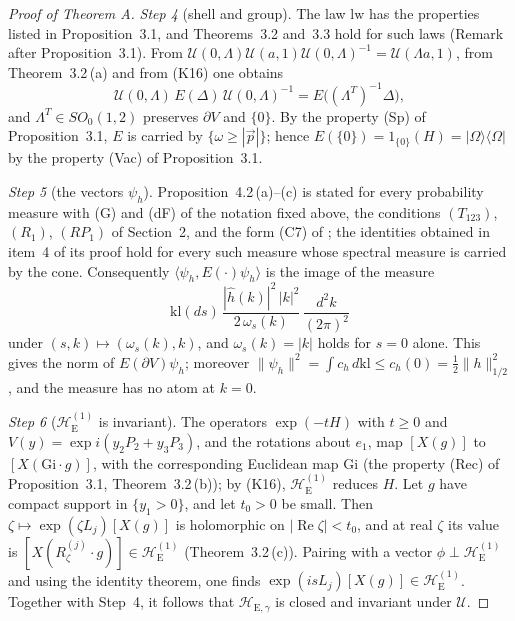 \documentclass[11pt,letterpaper,reqno]{amsart}
\theoremstyle{definition}
\begin{document}
\begin{proof}[Proof of Theorem A]
\emph{Step 4} (shell and group).
The law $\mathrm{lw}$ has the properties listed in Proposition~3.1, and Theorems~3.2 and~3.3 hold for such laws (Remark after Proposition~3.1).
From $\mathcal U(0,\allowbreak \Lambda)\mathcal U(a,\allowbreak 1)\mathcal U(0,\allowbreak \Lambda)^{-1}=\allowbreak \mathcal U(\Lambda a,\allowbreak 1)$, from Theorem~3.2\,(a) and from (K16) one obtains
\begin{equation*}
\mathcal U(0,\Lambda)\,E(\Delta)\,\mathcal U(0,\Lambda)^{-1}=E\bigl((\Lambda^T)^{-1}\Delta\bigr),
\end{equation*}
and $\Lambda^T\in SO_0(1,2)$ preserves $\partial V$ and $\{0\}$.
By the property (Sp) of Proposition~3.1, $E$ is carried by $\{\omega\ge|\vec p|\}$;
hence $E(\{0\})=1_{\{0\}}(H)=|\Omega\rangle\langle\Omega|$ by the property (Vac) of Proposition~3.1.

\emph{Step 5} (the vectors $\psi_h$).
Proposition~4.2\,(a)--(c) is stated for every probability measure with (G) and (dF) of the notation fixed above, the conditions $(T_{123})$, $(R_1)$, $(RP_1)$ of Section~2, and the form (C7) of \cite[Theorem~44]{QEDIII};
the identities obtained in item~4 of its proof hold for every such measure whose spectral measure is carried by the cone.
Consequently $\langle\psi_h,E(\cdot)\psi_h\rangle$ is the image of the measure
\begin{equation*}
\mathrm{kl}(ds)\,\frac{|\hat h(k)|^2\,|k|^2}{2\,\omega_s(k)}\,\frac{d^2k}{(2\pi)^2}
\end{equation*}
under $(s,k)\mapsto(\omega_s(k),k)$, and $\omega_s(k)=|k|$ holds for $s=0$ alone.
This gives the norm of $E(\partial V)\psi_h$;
moreover $\|\psi_h\|^2=\allowbreak \int c_h\,\allowbreak d\mathrm{kl}\le c_h(0)=\allowbreak \frac12\|h\|_{1/2}^2$, and the measure has no atom at $k=0$.

\emph{Step 6} ($\mathcal H_{\mathrm E}^{(1)}$ is invariant).
The operators $\exp(-tH)$ with $t\ge0$ and $V(y)=\exp i(y_2P_2+y_3P_3)$, and the rotations about $e_1$, map $[X(g)]$ to $[X(\mathrm{Gi}\cdot g)]$, with the corresponding Euclidean map $\mathrm{Gi}$ (the property (Rec) of Proposition~3.1, Theorem~3.2\,(b));
by (K16), $\mathcal H_{\mathrm E}^{(1)}$ reduces $H$.
Let $g$ have compact support in $\{y_1>0\}$, and let $t_0>0$ be small.
Then $\zeta\mapsto\exp(\zeta L_j)[X(g)]$ is holomorphic on $|\operatorname{Re}\zeta|<t_0$, and at real $\zeta$ its value is $[X(R^{(j)}_\zeta\cdot g)]\in\mathcal H_{\mathrm E}^{(1)}$ (Theorem~3.2\,(c)).
Pairing with a vector $\phi\perp\mathcal H_{\mathrm E}^{(1)}$ and using the identity theorem, one finds $\exp(isL_j)[X(g)]\in\mathcal H_{\mathrm E}^{(1)}$.
Together with Step~4, it follows that $\mathcal H_{\mathrm E,\gamma}$ is closed and invariant under $\mathcal U$.


\end{proof}
\end{document}
